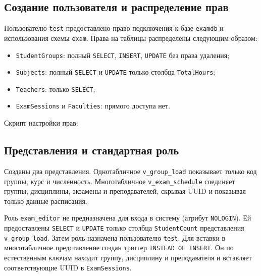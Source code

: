 \documentclass[12pt,a4paper]{article}
\begin{document}
\subsection*{Создание пользователя и распределение прав}
Пользователю \texttt{test} предоставлено право подключения к базе
\texttt{examdb} и использования схемы \texttt{exam}. Права на таблицы
распределены следующим образом:
\begin{itemize}
\item \texttt{StudentGroups}: полный \texttt{SELECT}, \texttt{INSERT},
\texttt{UPDATE} без права удаления;
\item \texttt{Subjects}: полный \texttt{SELECT} и \texttt{UPDATE} только
столбца \texttt{TotalHours};
\item \texttt{Teachers}: только \texttt{SELECT};
\item \texttt{ExamSessions} и \texttt{Faculties}: прямого доступа нет.
\end{itemize}
Скрипт настройки прав:


\subsection*{Представления и стандартная роль}
Созданы два представления. Однотабличное \texttt{v\_group\_load}
показывает только код группы, курс и численность. Многотабличное
\texttt{v\_exam\_schedule} соединяет группы, дисциплины, экзамены и
преподавателей, скрывая UUID и показывая только данные расписания.

Роль \texttt{exam\_editor} не предназначена для входа в систему
(атрибут \texttt{NOLOGIN}). Ей предоставлены \texttt{SELECT} и
\texttt{UPDATE} только столбца \texttt{StudentCount} представления
\texttt{v\_group\_load}. Затем роль назначена пользователю \texttt{test}.
Для вставки в многотабличное представление создан триггер
\texttt{INSTEAD OF INSERT}. Он по естественным ключам находит группу,
дисциплину и преподавателя и вставляет соответствующие UUID в
\texttt{ExamSessions}.
\end{document}
